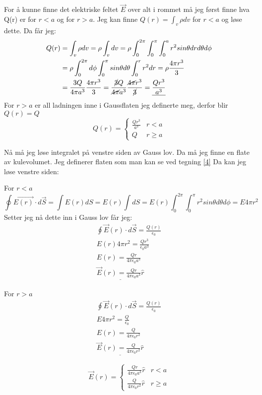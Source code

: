 \documentclass[a4paper,12pt,norsk]{article}
\begin{document}
For å kunne finne det elektriske feltet $\vec{E}$ over alt i rommet må jeg først finne hva Q(r) er for $r< a$ og for $r>a$. Jeg kan finne $ Q(r) = \int_v \rho dv$ for $r<a$ og løse dette. Da får jeg:
\begin{align*}
Q(r) &= \int_v \rho dv = \rho \int_v dv = \rho \int_0^{2\pi}\int_0^{\pi} \int_0^{a}r^2 sin\theta dr d\theta d\phi\\ &= \rho \int_0^{2\pi}d\phi \int_0^{\pi} sin\theta d\theta \int_0^{r}r^2 dr = \rho \frac{4\pi r^3}{3} \\ 
&= \frac{3Q}{4\pi a^3} \frac{4\pi r^3}{3} = \frac{\cancel{3}Q}{\cancel{4\pi} a^3} \frac{\cancel{4\pi} r^3}{\cancel{3}} = \underline{\frac{Qr^3}{a^3}}
\end{align*}
For $r>a$ er all ladningen inne i Gaussflaten jeg definerte meg, derfor blir $Q(r) = Q$
\[ Q(r) = \begin{cases}
 \frac{Qr^3}{a^3}& r < a\\
 Q &  r \geq a
\end{cases}\]

Nå må jeg løse integralet på venstre siden av Gauss lov. Da må jeg finne en flate av kulevolumet. Jeg definerer flaten som man kan se ved tegning \ref{4} 
Da kan jeg løse venstre siden:

For $r<a$ 
$$\oint \vec{E(r)} \cdot d\vec{S} = \int E(r)dS = E(r)\int dS = E(r) \int_0^{2\pi}\int_0^\pi r^2sin\theta d\theta d\phi = E4\pi r^2$$
Setter jeg nå dette inn i Gauss lov får jeg:
\begin{align*}
\oint \vec{E}(r) \cdot d\vec{S} = \frac{Q(r)}{\epsilon_0}\\
E(r)4\pi r^2 = \frac{Qr^3}{\epsilon_0a^3}\\
E(r) =  \frac{Qr}{4\pi \epsilon_0 a^3}\\
\underline{\vec{E}(r) =  \frac{Qr}{4\pi \epsilon_0 a^3}\hat{r}}
\end{align*}

For $r>a$
 \begin{align*}
\oint \vec{E}(r) \cdot d\vec{S} = \frac{Q(r)}{\epsilon_0}\\
E4\pi r^2 = \frac{Q}{\epsilon_0}\\
E(r) =  \frac{Q}{4\pi \epsilon_0 r^2}\\
\underline{\vec{E}(r) =  \frac{Q}{4\pi \epsilon_0r^2}\hat{r}}
\end{align*}

\[ \vec{E}(r) = \begin{cases}
 \frac{Qr}{4\pi \epsilon_0 a^3}\hat{r} & r < a\\
 \frac{Q}{4\pi \epsilon_0r^2}\hat{r} &  r \geq a
\end{cases}\]
\end{document}
